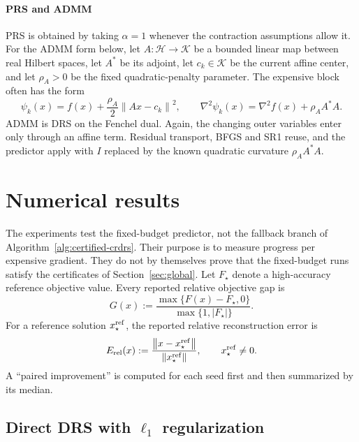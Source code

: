 \documentclass[10pt,leqno]{amsart}
\numberwithin{equation}{section}
\numberwithin{algorithm}{section}
\theoremstyle{remark}
\newcommand{\Hcal}{\mathcal{H}}
\newcommand{\Kcal}{\mathcal{K}}
\newcommand{\norm}[1]{\left\lVert #1 \right\rVert}
\newcommand{\grad}{\nabla}
\begin{document}
\paragraph{PRS and ADMM}
PRS is obtained by taking $\alpha=1$ whenever the contraction assumptions allow it.  For the ADMM form below, let $A:\Hcal\to\Kcal$ be a bounded linear map between real Hilbert spaces, let $A^*$ be its adjoint, let $c_k\in\Kcal$ be the current affine center, and let $\rho_{\!A}>0$ be the fixed quadratic-penalty parameter.  The expensive block often has the form
\begin{equation}
\label{eq:admm-affine-family-focused}
    \psi_k(x)=f(x)+\frac{\rho_{\!A}}{2}\norm{Ax-c_k}^2,
    \qquad
    \grad^2\psi_k(x)=\grad^2f(x)+\rho_{\!A} A^*A.
\end{equation}
ADMM is DRS on the Fenchel dual.  Again, the changing outer variables enter only through an affine term.  Residual transport, BFGS and SR1 reuse, and the predictor apply with $I$ replaced by the known quadratic curvature $\rho_{\!A}A^*A$.

\section{Numerical results}
\label{sec:numerics}

The experiments test the fixed-budget predictor, not the fallback branch of Algorithm~\ref{alg:certified-crdrs}.  Their purpose is to measure progress per expensive gradient.  They do not by themselves prove that the fixed-budget runs satisfy the certificates of Section~\ref{sec:global}.  Let $F_\star$ denote a high-accuracy reference objective value.  Every reported relative objective gap is
\begin{equation}
\label{eq:numerical-relative-gap}
  G(x):=\frac{\max\{F(x)-F_\star,0\}}
              {\max\{1,|F_\star|\}}.
\end{equation}
For a reference solution $x_\star^{\rm ref}$, the reported relative reconstruction error is
\begin{equation}
\label{eq:numerical-relative-error}
  E_{\rm rel}(x):=
  \frac{\norm{x-x_\star^{\rm ref}}}
       {\norm{x_\star^{\rm ref}}},
  \qquad x_\star^{\rm ref}\ne0.
\end{equation}
A ``paired improvement'' is computed for each seed first and then summarized by its median.

\subsection{Direct DRS with \texorpdfstring{$\ell_1$}{l1} regularization}
\end{document}

